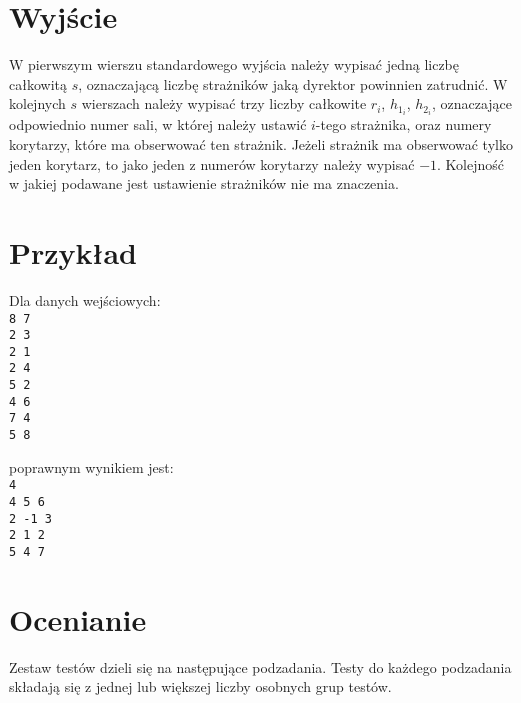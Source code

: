 \documentclass[10pt]{article}
\begin{document}

    \section*{Wyjście}
    
    W pierwszym wierszu standardowego wyjścia należy wypisać jedną liczbę całkowitą $s$, oznaczającą liczbę strażników jaką dyrektor powinnien zatrudnić. W kolejnych $s$ wierszach należy wypisać trzy liczby całkowite $r_{i}$, $h_{1_{i}}$, $h_{2_{i}}$, oznaczające odpowiednio numer sali, w której należy ustawić $i$-tego strażnika, oraz numery korytarzy, które ma obserwować ten strażnik. Jeżeli strażnik ma obserwować tylko jeden korytarz, to jako jeden z numerów korytarzy należy wypisać $-1$. Kolejność w jakiej podawane jest ustawienie strażników nie ma znaczenia.


    \section*{Przykład}
    
    \noindent
    \begin{minipage}[t]{0.5\textwidth}
        Dla danych wejściowych:\vspace{1ex}\\
        \texttt{8 7\\2 3\\2 1\\2 4\\5 2\\4 6\\7 4\\5 8}
    \end{minipage}
    \begin{minipage}[t]{0.5\textwidth}
        poprawnym wynikiem jest:\vspace{1ex}\\
        \texttt{4\\4 5 6\\2 -1 3\\2 1 2\\5 4 7}
    \end{minipage}
    

    \section*{Ocenianie}
        
    Zestaw testów dzieli się na następujące podzadania. Testy do każdego podzadania składają się z jednej lub większej liczby osobnych grup testów.
    
\end{document}
